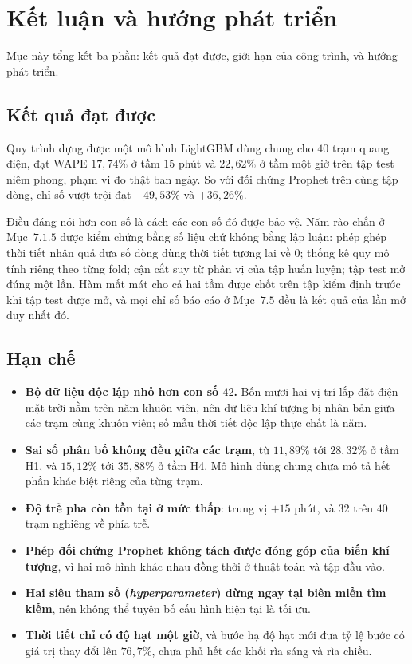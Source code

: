 \documentclass[12pt, a4paper]{report}
\begin{document}
\FloatBarrier
\section{Kết luận và hướng phát triển}

Mục này tổng kết ba phần: kết quả đạt được, giới hạn của công trình, và hướng phát triển.

\FloatBarrier
\subsection{Kết quả đạt được}

Quy trình dựng được một mô hình LightGBM dùng chung cho $40$ trạm quang điện, đạt WAPE
$17{,}74\%$ ở tầm $15$ phút và $22{,}62\%$ ở tầm một giờ trên tập test niêm phong, phạm vi đo
thật ban ngày. So với đối chứng Prophet trên cùng tập dòng, chỉ số vượt trội đạt $+49{,}53\%$
và $+36{,}26\%$.

Điều đáng nói hơn con số là cách các con số đó được bảo vệ. Năm rào chắn ở Mục~$7.1.5$ được kiểm
chứng bằng số liệu chứ không bằng lập luận: phép ghép thời tiết nhân quả đưa số dòng dùng thời
tiết tương lai về $0$; thống kê quy mô tính riêng theo từng fold; cận cắt suy từ phân vị của
tập huấn luyện; tập test mở đúng một lần. Hàm mất mát cho cả hai tầm được chốt trên tập kiểm
định trước khi tập test được mở, và mọi chỉ số báo cáo ở Mục~$7.5$ đều là kết quả của lần mở
duy nhất đó.

\FloatBarrier
\subsection{Hạn chế}

\begin{itemize}
    \item \textbf{Bộ dữ liệu độc lập nhỏ hơn con số $42$.} Bốn mươi hai vị trí lắp đặt điện mặt trời nằm trên
    năm khuôn viên, nên dữ liệu khí tượng bị nhân bản giữa các trạm cùng khuôn viên; số mẫu
    thời tiết độc lập thực chất là năm.
    \item \textbf{Sai số phân bố không đều giữa các trạm}, từ $11{,}89\%$ tới $28{,}32\%$ ở
    tầm H1, và $15{,}12\%$ tới $35{,}88\%$ ở tầm H4. Mô hình dùng chung chưa mô tả hết phần khác
    biệt riêng của từng trạm.
    \item \textbf{Độ trễ pha còn tồn tại ở mức thấp}: trung vị $+15$ phút, và $32$ trên $40$
    trạm nghiêng về phía trễ.
    \item \textbf{Phép đối chứng Prophet không tách được đóng góp của biến khí tượng}, vì hai
    mô hình khác nhau đồng thời ở thuật toán và tập đầu vào.
    \item \textbf{Hai siêu tham số (\textit{hyperparameter}) dừng ngay tại biên miền tìm kiếm}, nên không thể tuyên bố
    cấu hình hiện tại là tối ưu.
    \item \textbf{Thời tiết chỉ có độ hạt một giờ}, và bước hạ độ hạt mới đưa tỷ lệ
    bước có giá trị thay đổi lên $76{,}7\%$, chưa phủ hết các khối rìa sáng và rìa chiều.
\end{itemize}
\end{document}
